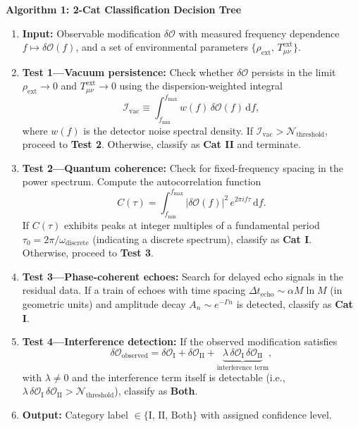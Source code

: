 \documentclass[11pt]{article}
\begin{document}
\begin{minipage}{\textwidth}
\textbf{Algorithm 1: 2-Cat Classification Decision Tree}
\begin{enumerate}
\item \textbf{Input:} Observable modification $\delta\mathcal{O}$ with measured frequency dependence $f \mapsto \delta\mathcal{O}(f)$, and a set of environmental parameters $\{\rho_{\mathrm{ext}},\, T_{\mu\nu}^{\mathrm{ext}}\}$.

\item \textbf{Test 1---Vacuum persistence:} Check whether $\delta\mathcal{O}$ persists in the limit $\rho_{\mathrm{ext}} \to 0$ and $T_{\mu\nu}^{\mathrm{ext}} \to 0$ using the dispersion-weighted integral
\[
\mathcal{I}_{\mathrm{vac}} \equiv \int_{f_{\min}}^{f_{\max}} w(f)\, \delta\mathcal{O}(f)\, \mathrm{d}f,
\]
where $w(f)$ is the detector noise spectral density. If $\mathcal{I}_{\mathrm{vac}} > \mathcal{N}_{\mathrm{threshold}}$, proceed to \textbf{Test 2}. Otherwise, classify as \textbf{Cat II} and terminate.

\item \textbf{Test 2---Quantum coherence:} Check for fixed-frequency spacing in the power spectrum. Compute the autocorrelation function
\[
C(\tau) = \int_{f_{\min}}^{f_{\max}} |\delta\mathcal{O}(f)|^2 \, e^{2\pi i f \tau}\, \mathrm{d}f.
\]
If $C(\tau)$ exhibits peaks at integer multiples of a fundamental period $\tau_0 = 2\pi/\omega_{\mathrm{discrete}}$ (indicating a discrete spectrum), classify as \textbf{Cat I}. Otherwise, proceed to \textbf{Test 3}.

\item \textbf{Test 3---Phase-coherent echoes:} Search for delayed echo signals in the residual data. If a train of echoes with time spacing $\Delta t_{\mathrm{echo}} \sim \alpha M \ln M$ (in geometric units) and amplitude decay $A_n \sim e^{-\Gamma n}$ is detected, classify as \textbf{Cat I}.

\item \textbf{Test 4---Interference detection:} If the observed modification satisfies
\[
\delta\mathcal{O}_{\mathrm{observed}} = \delta\mathcal{O}_{\mathrm{I}} + \delta\mathcal{O}_{\mathrm{II}} + \underbrace{\lambda\, \delta\mathcal{O}_{\mathrm{I}}\, \delta\mathcal{O}_{\mathrm{II}}}_{\text{interference term}},
\]
with $\lambda \neq 0$ and the interference term itself is detectable (i.e., $\lambda\, \delta\mathcal{O}_{\mathrm{I}}\, \delta\mathcal{O}_{\mathrm{II}} > \mathcal{N}_{\mathrm{threshold}}$), classify as \textbf{Both}.

\item \textbf{Output:} Category label $\in \{\text{I, II, Both}\}$ with assigned confidence level.
\end{enumerate}
\end{minipage}
\end{document}
